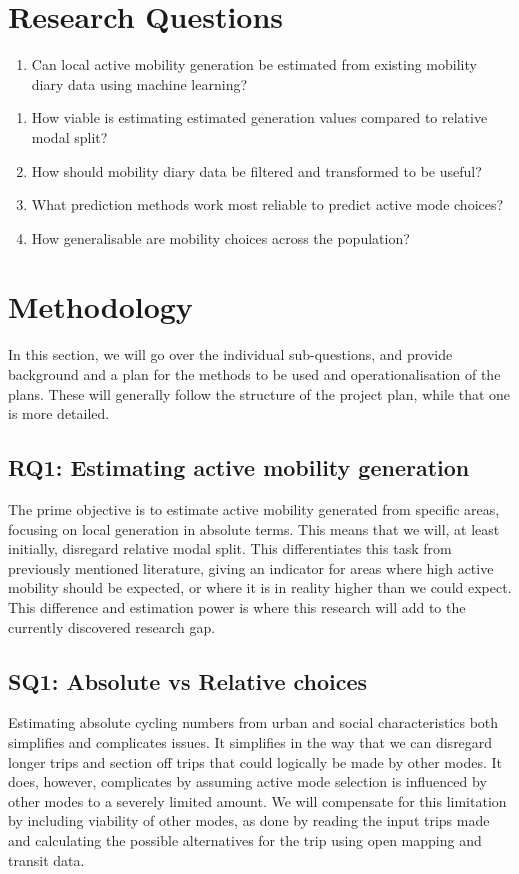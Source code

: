 \documentclass[sigconf, natbib=false, nonacm]{acmart}
\begin{document}
\section{Research Questions}
    \label{section:rq}
    \begin{enumerate}[label=RQ\arabic*]
        \item Can local active mobility generation be estimated from existing mobility diary data using machine learning?
    \end{enumerate}
    \begin{enumerate}[label=SQ\arabic*]
        \item How viable is estimating estimated generation values compared to relative modal split? 
        \item How should mobility diary data be filtered and transformed to be useful?
        \item What prediction methods work most reliable to predict active mode choices?
        \item How generalisable are mobility choices across the population?
    \end{enumerate}

\section{Methodology}\label{section:methodology}
    In this section, we will go over the individual sub-questions, and provide background and a plan for the methods to be used and operationalisation of the plans. These will generally follow the structure of the project plan, while that one is more detailed. 

    \subsection{RQ1: Estimating active mobility generation}
    The prime objective is to estimate active mobility generated from specific areas, focusing on local generation in absolute terms. This means that we will, at least initially, disregard relative modal split. This differentiates this task from previously mentioned literature, giving an indicator for areas where high active mobility should be expected, or where it is in reality higher than we could expect. This difference and estimation power is where this research will add to the currently discovered research gap.

    \subsection{SQ1: Absolute vs Relative choices}
    Estimating absolute cycling numbers from urban and social characteristics both simplifies and complicates issues. It simplifies in the way that we can disregard longer trips and section off trips that could logically be made by other modes. It does, however, complicates by assuming active mode selection is influenced by other modes to a severely limited amount. We will compensate for this limitation by including viability of other modes, as done by reading the input trips made and calculating the possible alternatives for the trip using open mapping and transit data. 
\end{document}
